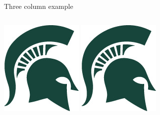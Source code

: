 \documentclass[aspectratio=169]{beamer}
\begin{document}
\begin{frame}
  {Three column example}
  \begin{columns}[T]
    \includegraphics[width=\textwidth]{Spartan-helmet.jpg}
    \includegraphics[width=\textwidth]{Spartan-helmet.jpg}

\end{columns}
\end{frame}
\end{document}
